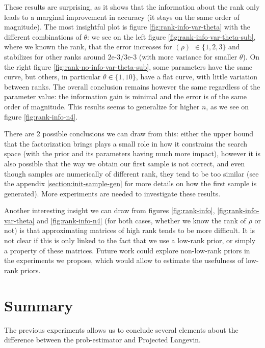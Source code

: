 \documentclass[12pt]{memoir}
\newcommand{\rhorank}[0]{\text{rank}$(\rho) $ }
\begin{document}
These results are surprising, as it shows that the information about the rank only leads to a marginal improvement in accuracy (it stays on the same order of magnitude). The most insightful plot is figure \ref{fig:rank-info-var-theta} with the different combinations of $\theta$: we see on the left figure \ref{fig:rank-info-var-theta-sub}, where we known the rank, that the error increases for \rhorank{$\in \{1,2,3\}$} and stabilizes for other ranks around $2\text{e-}3/3\text{e-}3$ (with more variance for smaller $\theta$). On the right figure \ref{fig:rank-no-info-var-theta-sub}, some parameters have the same curve, but others, in particular $\theta \in\{1,10\}$, have a flat curve, with little variation between ranks. The overall conclusion remains however the same regardless of the parameter value: the information gain is minimal and the error is of the same order of magnitude.
This results seems to generalize for higher $n$, as we see on figure \ref{fig:rank-info-n4}. \medbreak

There are 2 possible conclusions we can draw from this: either the upper bound that the factorization brings plays a small role in how it constrains the search space (with the prior and its parameters having much more impact), however it is also possible that the way we obtain our first sample is not correct, and even though samples are numerically of different rank, they tend to be too similar (see the appendix \ref{section:init-sample-gen} for more details on how the first sample is generated). More experiments are needed to investigate these results.\medbreak

Another interesting insight we can draw from figures \ref{fig:rank-info}, \ref{fig:rank-info-var-theta} and \ref{fig:rank-info-n4} (for both cases, whether we know the rank of $\rho$ or not) is that approximating matrices of high rank tends to be more difficult. It is not clear if this is only linked to the fact that we use a low-rank prior, or simply a property of these matrices. Future work could explore non-low-rank priors in the experiments we propose, which would allow to estimate the usefulness of low-rank priors.

\section{Summary}
The previous experiments allows us to conclude several elements about the difference between the prob-estimator and Projected Langevin. \medbreak
\end{document}
